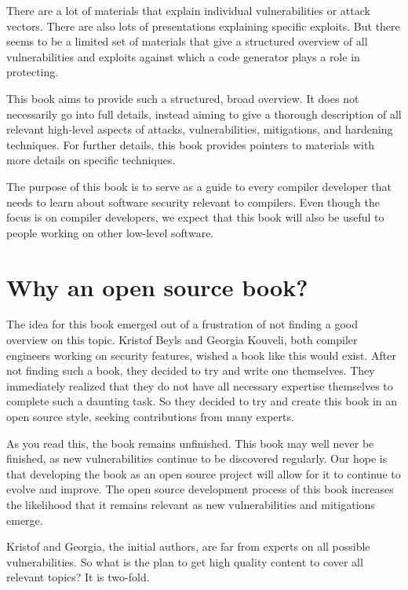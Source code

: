 \documentclass[
  a4paper,
]{report}
\begin{document}
There are a lot of materials that explain individual vulnerabilities or
attack vectors. There are also lots of presentations explaining specific
exploits. But there seems to be a limited set of materials that give a
structured overview of all vulnerabilities and exploits against which a
code generator plays a role in protecting.

This book aims to provide such a structured, broad overview. It does not
necessarily go into full details, instead aiming to give a thorough
description of all relevant high-level aspects of attacks,
vulnerabilities, mitigations, and hardening techniques. For further
details, this book provides pointers to materials with more details on
specific techniques.

The purpose of this book is to serve as a guide to every compiler
developer that needs to learn about software security relevant to
compilers. Even though the focus is on compiler developers, we expect
that this book will also be useful to people working on other low-level
software.

\hypertarget{why-an-open-source-book}{%
\section{Why an open source book?}\label{why-an-open-source-book}}

The idea for this book emerged out of a frustration of not finding a
good overview on this topic. Kristof Beyls and Georgia Kouveli, both
compiler engineers working on security features, wished a book like this
would exist. After not finding such a book, they decided to try and
write one themselves. They immediately realized that they do not have
all necessary expertise themselves to complete such a daunting task. So
they decided to try and create this book in an open source style,
seeking contributions from many experts.

As you read this, the book remains unfinished. This book may well never
be finished, as new vulnerabilities continue to be discovered regularly.
Our hope is that developing the book as an open source project will
allow for it to continue to evolve and improve. The open source
development process of this book increases the likelihood that it
remains relevant as new vulnerabilities and mitigations emerge.

Kristof and Georgia, the initial authors, are far from experts on all
possible vulnerabilities. So what is the plan to get high quality
content to cover all relevant topics? It is two-fold.
\end{document}

